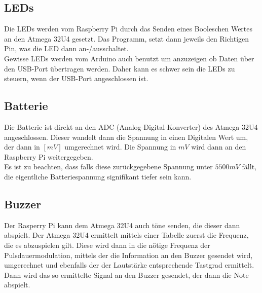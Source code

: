 \documentclass[a4paper, 12pt]{article}
\begin{document}
\subsection*{LEDs}
Die LEDs werden vom Raspberry Pi durch das Senden eines Booleschen Wertes an den Atmega 32U4 gesetzt. Das Programm, setzt dann jeweils den Richtigen Pin, was die LED dann an-/ausschaltet.\\
Gewisse LEDs werden vom Arduino auch benutzt um anzuzeigen ob Daten über den USB-Port übertragen werden. Daher kann es schwer sein die LEDs zu steuern, wenn der USB-Port angeschlossen ist.

\subsection*{Batterie}
Die Batterie ist direkt an den ADC (Analog-Digital-Konverter) des Atmega 32U4 angeschlossen. Dieser wandelt dann die Spannung in einen Digitalen Wert um, der dann in $[mV]$ umgerechnet wird. Die Spannung in $mV$ wird dann an den Raspberry Pi weitergegeben.\\
Es ist zu beachten, dass falls diese zurückgegebene Spannung unter $5500 mV$ fällt, die eigentliche Batteriespannung signifikant tiefer sein kann.

\subsection*{Buzzer}
Der Rasperry Pi kann dem Atmega 32U4 auch töne senden, die dieser dann abspielt. Der Atmega 32U4 ermittelt mittels einer Tabelle zuerst die Frequenz, die es abzuspielen gilt. Diese wird dann in die nötige Frequenz der Pulsdauermodulation, mittels der die Information an den Buzzer gesendet wird, umgerechnet und ebenfalls der der Lautstärke entsprechende Tastgrad ermittelt. Dann wird das so ermittelte Signal an den Buzzer gesendet, der dann die Note abspielt.

\begin{landscape}
	\LARGE
	\hspace{-2.5cm}
	\resizebox{!}{\textheight}{
		
	}
\end{landscape}
	
\end{document}
